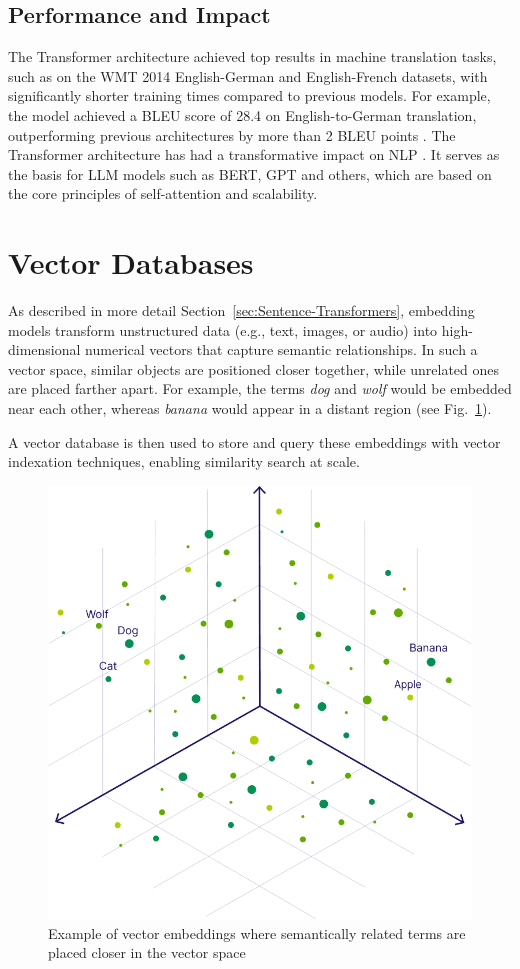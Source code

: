 



\subsection{Performance and Impact}  
The Transformer architecture achieved top results in machine translation tasks, such as on the WMT 2014 English-German and English-French datasets, with significantly shorter training times compared to previous models. For example, the model achieved a BLEU score of 28.4 on English-to-German translation, outperforming previous architectures by more than 2 BLEU points \cite{vaswani2017attention}.  
The Transformer architecture has had a transformative impact on \ac{NLP} . It serves as the basis for \ac{LLM} models such as BERT, GPT and others, which are based on the core principles of self-attention and scalability.

\section{Vector Databases}
\label{sec:vector-store}
As described in more detail Section~\ref{sec:Sentence-Transformers}, embedding models transform unstructured data (e.g., text, images, or audio) into high-dimensional numerical vectors that capture semantic relationships. In such a vector space, similar objects are positioned closer together, while unrelated ones are placed farther apart. For example, the terms \emph{dog} and \emph{wolf} would be embedded near each other, whereas \emph{banana} would appear in a distant region (see Fig.~\ref{fig:vector-embedding}).  

A vector database is then used to store and query these embeddings with vector indexation techniques, enabling similarity search at scale.
\begin{figure}[h]
    \centering
    \includegraphics[width=0.55\linewidth]{Images/vector-embedding.jpg}
    \caption{Example of vector embeddings where semantically related terms are placed closer in the vector space}
    \label{fig:vector-embedding}
\end{figure}

